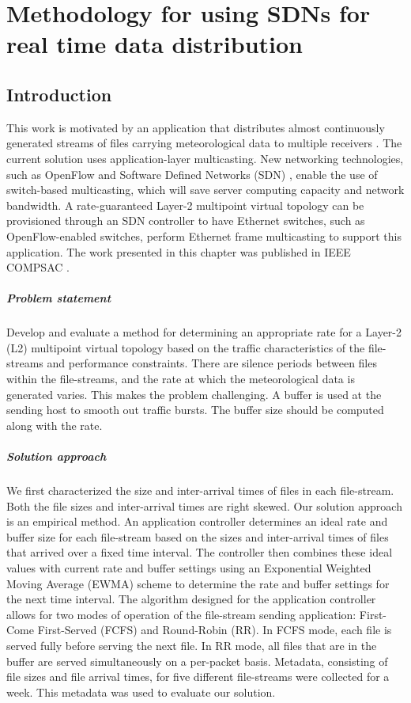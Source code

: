 \chapter{Methodology for using SDNs for real time data distribution}
\label{sec:rpmf}
\section{Introduction}
\label{sec:intro}
This work is motivated by an application that distributes
almost continuously generated streams of files carrying
meteorological data to multiple receivers \cite{IDD}. The current
solution uses application-layer multicasting.
New networking
technologies, such as OpenFlow and Software Defined
Networks (SDN) \cite{OpenFlow}, enable the use of switch-based multicasting,
which will save server computing capacity and network bandwidth.
A rate-guaranteed Layer-2 multipoint virtual topology can be provisioned through an SDN controller to have Ethernet switches, such as OpenFlow-enabled switches, perform Ethernet frame multicasting to support
this application. The work presented in this chapter was
published in IEEE COMPSAC \cite{ji2015file, chen2016file}.

\paragraph{Problem statement} Develop and evaluate a method for
determining an appropriate rate for a Layer-2 (L2) multipoint virtual topology
based on the traffic characteristics of the file-streams and performance
constraints. There are silence periods between files within the file-streams, and the rate at which the meteorological data is generated varies. This makes the problem challenging. A buffer is used at the
sending host to smooth out traffic bursts. The buffer size should
be computed along with the rate.

\paragraph{Solution approach}
We first characterized the size and inter-arrival times of files in each file-stream. Both the file sizes and inter-arrival times are right skewed.
Our solution approach is an empirical method. An application controller
determines an ideal rate and buffer size
for each file-stream based on the sizes and inter-arrival times of files that arrived over a fixed time interval. The controller then combines these ideal values with current rate and buffer settings using an Exponential Weighted Moving Average (EWMA) scheme to determine the rate and buffer settings for the next time interval. The algorithm designed
for the application controller allows for two modes of operation of
the file-stream sending application: First-Come First-Served (FCFS)
and Round-Robin (RR). In FCFS mode, each file is served fully before
serving the next file. In RR mode, all files that are in the buffer are served simultaneously on a per-packet basis. Metadata, consisting of file
sizes and file arrival times, for five different file-streams were collected for a week. This metadata was used to evaluate our solution.

